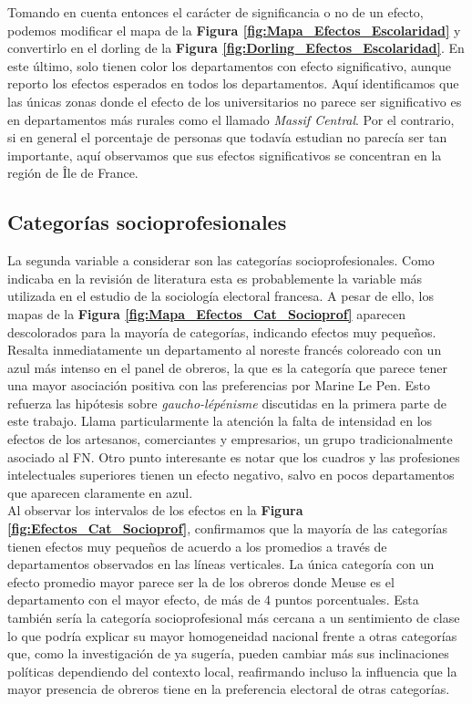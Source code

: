 Tomando en cuenta entonces el carácter de significancia o no de un efecto, podemos modificar el mapa de la \textbf{Figura \ref{fig:Mapa_Efectos_Escolaridad}} y convertirlo en el dorling de la \textbf{Figura \ref{fig:Dorling_Efectos_Escolaridad}}. En este último, solo tienen color los departamentos con efecto significativo, aunque reporto los efectos esperados en todos los departamentos. Aquí identificamos que las únicas zonas donde el efecto de los universitarios no parece ser significativo es en departamentos más rurales como el llamado \textit{Massif Central}. Por el contrario, si en general el porcentaje de personas que todavía estudian no parecía ser tan importante, aquí observamos que sus efectos significativos se concentran en la región de Île de France. 

\subsection{Categorías socioprofesionales}

La segunda variable a considerar son las categorías socioprofesionales. Como indicaba en la revisión de literatura esta es probablemente la variable más utilizada en el estudio de la sociología electoral francesa. A pesar de ello, los mapas de la \textbf{Figura \ref{fig:Mapa_Efectos_Cat_Socioprof}} aparecen descolorados para la mayoría de categorías, indicando efectos muy pequeños. Resalta inmediatamente un departamento al noreste francés coloreado con un azul más intenso en el panel de obreros, la que es la categoría que parece tener una mayor asociación positiva con las preferencias por Marine Le Pen. Esto refuerza las hipótesis sobre \textit{gaucho-lépénisme} discutidas en la primera parte de este trabajo. Llama particularmente la atención la falta de intensidad en los efectos de los artesanos, comerciantes y empresarios, un grupo tradicionalmente asociado al FN. Otro punto interesante es notar que los cuadros y las profesiones intelectuales superiores tienen un efecto negativo, salvo en pocos departamentos que aparecen claramente en azul.\\ 

Al observar los intervalos de los efectos en la \textbf{Figura \ref{fig:Efectos_Cat_Socioprof}}, confirmamos que la mayoría de las categorías tienen efectos muy pequeños de acuerdo a los promedios a través de departamentos observados en las líneas verticales. La única categoría con un efecto promedio mayor parece ser la de los obreros donde Meuse es el departamento con el mayor efecto, de más de 4 puntos porcentuales. Esta también sería la categoría socioprofesional más cercana a un sentimiento de clase lo que podría explicar su mayor homogeneidad nacional frente a otras categorías que, como la investigación de \textcite{MayerMichelat81} ya sugería, pueden cambiar más sus inclinaciones políticas dependiendo del contexto local, reafirmando incluso la influencia que la mayor presencia de obreros tiene en la preferencia electoral de otras categorías.\\ 

